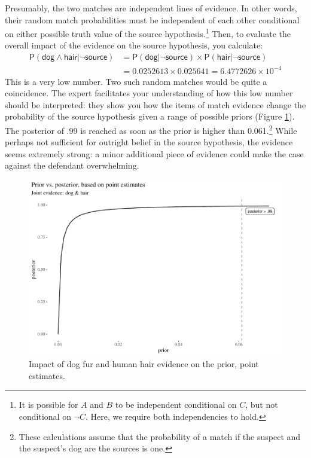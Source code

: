 \documentclass[
  10pt,
  dvipsnames,enabledeprecatedfontcommands]{scrartcl}
\newcommand{\pr}[1]{\mathsf{P}(#1)}
\newcommand{\s}[1]{\mbox{$\mathsf{#1}$}}
\begin{document}
Presumably, the two matches are independent lines of evidence. In other
words, their random match probabilities must be independent of each
other conditional on either possible truth value of the source
hypothesis.\footnote{It is possible for \(A\) and \(B\) to be
  independent conditional on \(C\), but not conditional on \(\neg C\).
  Here, we require both independencies to hold.} Then, to evaluate the
overall impact of the evidence on the source hypothesis, you calculate:
\begin{align*}
\pr{\s{dog}\wedge \s{hair} \vert \neg \s{source}} & = \pr{\s{dog} \vert \neg \s{source}} 
\times \pr{\s{hair} \vert \neg \s{source}} \\
& =  0.0252613 \times  0.025641 = \ensuremath{6.4772626\times 10^{-4}}
\end{align*} This is a very low number. Two such random matches would be
quite a coincidence. The expert facilitates your understanding of how
this low number should be interpreted: they show you how the items of
match evidence change the probability of the source hypothesis given a
range of possible priors (Figure \ref{fig:impactOfPoint}). The posterior
of .99 is reached as soon as the prior is higher than 0.061.\footnote{These
  calculations assume that the probability of a match if the suspect and
  the suspect's dog are the sources is one.} While perhaps not
sufficient for outright belief in the source hypothesis, the evidence
seems extremely strong: a minor additional piece of evidence could make
the case against the defendant overwhelming.

\begin{figure}[H]

\begin{center}\includegraphics[width=0.6\linewidth]{imprecision_philosophical_paper2_files/figure-latex/impactOfPoint4-1} \end{center}
\caption{Impact of dog fur and human hair evidence on the prior, point estimates.}
\label{fig:impactOfPoint}
\end{figure}
\end{document}
